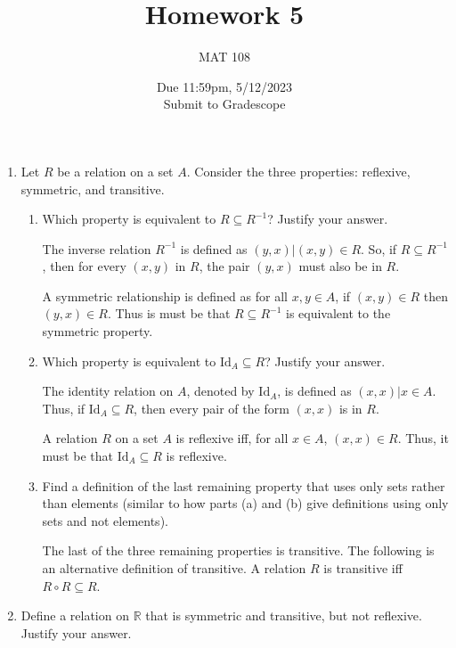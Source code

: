 \documentclass{article}
\title{Homework 5}
\author{MAT 108}
\date{Due 11:59pm, 5/12/2023\\ 
\vspace{0.1cm}
Submit to Gradescope}
\newcommand{\bR}{\mathbb{R}}
\begin{document}
\maketitle

{\large

\begin{enumerate}[labelindent=0pt,leftmargin=0pt]

    \setlength{\itemsep}{13pt} 

    \item Let $R$ be a relation on a set $A$. Consider the three properties: reflexive, symmetric, and transitive.\begin{enumerate}
    \item Which property is equivalent to $R\subseteq R^{-1}$? Justify your answer.

    The inverse relation $R^{-1}$ is defined as ${(y, x) | (x, y) \in R}$. So, if $R\subseteq R^{-1}$, then for every  $(x, y)$ in $R$, the pair $(y, x)$ must also be in $R$.

    A symmetric relationship is defined as for all $x, y \in A$, if $(x, y) \in R$ then $(y, x) \in R$. Thus is must be that $R\subseteq R^{-1}$ is equivalent to the symmetric property. 
    
    \item Which property is equivalent to $\text{Id}_A\subseteq R$? Justify your answer.

    The identity relation on $A$, denoted by $\text{Id}_A$, is defined as ${(x, x) | x \in A}$. 
    Thus, if $\text{Id}_A\subseteq R$, then every pair of the form $(x, x)$ is in $R$.

    A relation $R$ on a set $A$ is reflexive iff, for all $x \in A$, $(x, x) \in R$. 
    Thus, it must be that $\text{Id}_A\subseteq R$ is reflexive. 
    
    \item Find a definition of the last remaining property that uses only sets rather than elements (similar to how parts (a) and (b) give definitions using only sets and not elements).

    The last of the three remaining properties is transitive. 
    The following is an alternative definition of transitive. 
    A relation $R$ is transitive iff $R \circ R \subseteq R$.
    
    \end{enumerate}
    
    \item Define a relation on $\bR$ that is symmetric and transitive, but not reflexive. Justify your answer.


\end{enumerate}}
\end{document}
